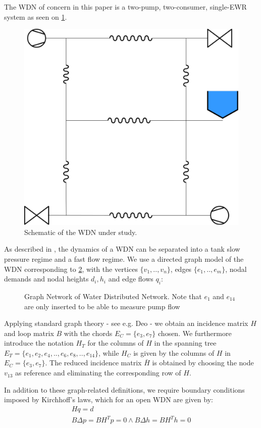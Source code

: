 The WDN of concern in this paper is a two-pump, two-consumer, single-EWR system as seen on \cref{fig:WDNModel}.

\begin{figure}[h]
	\centering
	\includegraphics[width=0.5\linewidth]{Graphics/WDNModel.pdf}
	\caption{Schematic of the WDN under study.}
	\label{fig:WDNModel}
\end{figure}

As described in , the dynamics of a WDN can be separated into a tank slow pressure regime and a fast flow regime. We use a directed graph model of the WDN corresponding to \cref{fig:tikzWDNGraph}, with the vertices $\{v_1,..,v_n\}$, edges $\{e_1,..,e_m\}$, nodal demands and nodal heights $d_i, h_i$ and edge flows $q_i$:

\begin{figure}[h!]
	\centering
	\resizebox{\columnwidth}{!}{
		}
	\caption{Graph Network of Water Distributed Network. Note that $e_1$ and $e_{14} $ are only inserted to be able to measure pump flow}
	\label{fig:tikzWDNGraph}
\end{figure}  

Applying standard graph theory - see e.g. Deo \cite{Deo} - we obtain an incidence matrix $H$ and loop matrix $B$ with the chords $E_C=\{e_3,e_7\}$ chosen. We furthermore introduce the notation $H_T$ for the columns of $H$ in the spanning tree $E_T=\{e_1,e_2,e_4,..,e_6,e_8,..,e_{14}\}$, while $H_C$ is given by the columns of $H$ in $E_C=\{e_3,e_7\}$. The reduced incidence matrix $\bar{H}$ is obtained by choosing the node $ v_{13} $ as reference and eliminating the corresponding row of $H$.

In addition to these graph-related definitions, we require boundary conditions imposed by Kirchhoff's laws, which for an open WDN are given \cite{Jensen} by:
\begin{gather}
	Hq = d \label{eq:KirchNodeLaw} \\
	B\Delta p = B H^T p = 0 \wedge B\Delta h = B H^T h = 0 \label{eq:KirchMeshLaw}
\end{gather} 

